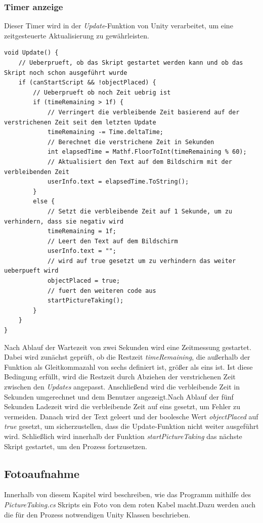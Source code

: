 \subsubsection*{Timer anzeige}
Dieser Timer wird in der \textit{Update}-Funktion von Unity verarbeitet, um eine zeitgesteuerte Aktualisierung zu gewährleisten.

\begin{lstlisting}[style=csharp, caption={Update des \textit{CableSearch} Skripts}, label=code:Timer]
void Update() {
    // Ueberprueft, ob das Skript gestartet werden kann und ob das Skript noch schon ausgeführt wurde
    if (canStartScript && !objectPlaced) {
        // Ueberprueft ob noch Zeit uebrig ist
        if (timeRemaining > 1f) {
            // Verringert die verbleibende Zeit basierend auf der verstrichenen Zeit seit dem letzten Update
            timeRemaining -= Time.deltaTime;
            // Berechnet die verstrichene Zeit in Sekunden
            int elapsedTime = Mathf.FloorToInt(timeRemaining % 60);
            // Aktualisiert den Text auf dem Bildschirm mit der verbleibenden Zeit
            userInfo.text = elapsedTime.ToString();
        }
        else {
            // Setzt die verbleibende Zeit auf 1 Sekunde, um zu verhindern, dass sie negativ wird
            timeRemaining = 1f;
            // Leert den Text auf dem Bildschirm
            userInfo.text = "";
            // wird auf true gesetzt um zu verhindern das weiter ueberpueft wird
            objectPlaced = true;
            // fuert den weiteren code aus
            startPictureTaking();
        }
    }
}
\end{lstlisting}
Nach Ablauf der Wartezeit von zwei Sekunden wird eine Zeitmessung gestartet. Dabei wird zunächst geprüft, ob die Restzeit \textit{timeRemaining}, die außerhalb der Funktion als Gleitkommazahl von sechs definiert ist, größer als eins ist. Ist diese Bedingung erfüllt, wird die Restzeit durch Abziehen der verstrichenen Zeit zwischen den \textit{Updates} angepasst. Anschließend wird die verbleibende Zeit in Sekunden umgerechnet und dem Benutzer angezeigt.Nach Ablauf der fünf Sekunden Ladezeit wird die verbleibende Zeit auf eins gesetzt, um Fehler zu vermeiden. Danach wird der Text geleert und der boolesche Wert \textit{objectPlaced} auf \textit{true} gesetzt, um sicherzustellen, dass die Update-Funktion nicht weiter ausgeführt wird. Schließlich wird innerhalb der Funktion \textit{startPictureTaking} das nächste Skript gestartet, um den Prozess fortzusetzen.

\subsection{\label{sec:Fotoaufnahme}Fotoaufnahme}
Innerhalb von diesem Kapitel wird beschreiben, wie das Programm mithilfe des \textit{PictureTaking.cs} Skripts ein Foto von dem roten Kabel macht.Dazu werden auch die für den Prozess notwendigen Unity Klassen beschrieben.

